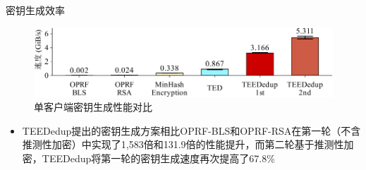 \documentclass{beamer}
\begin{document}
\begin{frame}{密钥生成效率}
    \begin{figure}[htpb]
        \centering
        \includegraphics[width=\linewidth]{../pic/sgxdedup/plot/exp_a2/expa2_keyGenPerformance.pdf}
        \caption{单客户端密钥生成性能对比}
    \end{figure}

    \begin{itemize}
        \item TEEDedup提出的密钥生成方案相比OPRF-BLS和OPRF-RSA在第一轮（不含推测性加密）中实现了1,583倍和131.9倍的性能提升，而第二轮基于推测性加密，TEEDedup将第一轮的密钥生成速度再次提高了67.8\%
    \end{itemize}
\end{frame}

\end{document}

